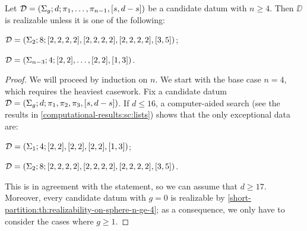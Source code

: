 \begin{theorem}\label{short-partition:th:realizability-on-higher-genus-n-ge-4}
Let $\mathcal{D}=(\Sigma_{g};d;\pi_1,\ldots,\pi_{n-1},[s,d-s])$ be a candidate datum with $n\ge 4$. Then $\DD$ is realizable unless it is one of the following:
\begin{enumarabic}
\item $\mathcal{D}=(\Sigma_{2};8;[2,2,2,2],[2,2,2,2],[2,2,2,2],[3,5])$;
\item $\mathcal{D}=(\Sigma_{n-3};4;[2,2],\ldots,[2,2],[1,3])$.
\end{enumarabic}
\end{theorem}
\begin{proof}
We will proceed by induction on $n$. We start with the base case $n=4$, which requires the heaviest casework. Fix a candidate datum $\mathcal{D}=(\Sigma_{g};d;\pi_1,\pi_2,\pi_3,[s,d-s])$. If $d\le 16$, a computer-aided search (see the results in \cref{computational-results:sc:lists}) shows that the only exceptional data are:
\begin{enumarabic}
\item $\mathcal{D}=(\Sigma_{1};4;[2, 2],[2, 2],[2, 2],[1, 3])$;
\item $\mathcal{D}=(\Sigma_{2};8;[2, 2, 2, 2],[2, 2, 2, 2],[2, 2, 2, 2],[3, 5])$.
\end{enumarabic}
This is in agreement with the statement, so we can assume that $d\ge 17$. Moreover, every candidate datum with $g=0$ is realizable by \cref{short-partition:th:realizability-on-sphere-n-ge-4}; as a consequence, we only have to consider the cases where $g\ge 1$.


\end{proof}
